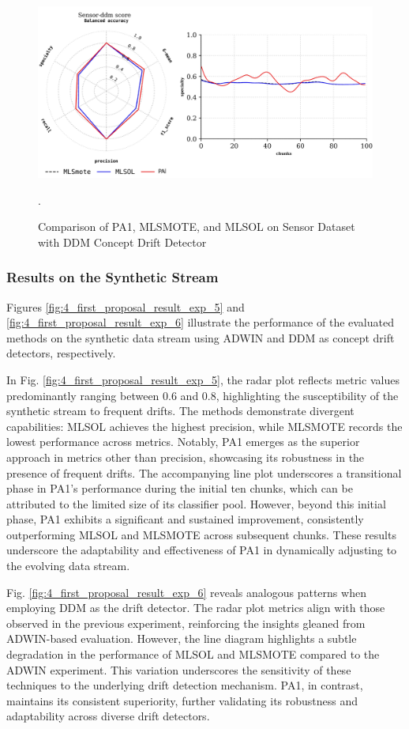 \begin{figure}[!ht]
	\centering
	\includegraphics[width=1\linewidth]{4_Imbalanced/figures/exp_4.png}
  \caption{Comparison of PA1, MLSMOTE, and MLSOL on Sensor Dataset with DDM Concept Drift Detector}.
	\label{fig:4_first_proposal_result_exp_4}
\end{figure}

\subsubsection{Results on the Synthetic Stream}

Figures \ref{fig:4_first_proposal_result_exp_5} and \ref{fig:4_first_proposal_result_exp_6} illustrate the performance of the evaluated methods on the synthetic data stream using ADWIN and DDM as concept drift detectors, respectively.

In Fig. \ref{fig:4_first_proposal_result_exp_5}, the radar plot reflects metric values predominantly ranging between 0.6 and 0.8, highlighting the susceptibility of the synthetic stream to frequent drifts. The methods demonstrate divergent capabilities: MLSOL achieves the highest precision, while MLSMOTE records the lowest performance across metrics. Notably, PA1 emerges as the superior approach in metrics other than precision, showcasing its robustness in the presence of frequent drifts. The accompanying line plot underscores a transitional phase in PA1’s performance during the initial ten chunks, which can be attributed to the limited size of its classifier pool. However, beyond this initial phase, PA1 exhibits a significant and sustained improvement, consistently outperforming MLSOL and MLSMOTE across subsequent chunks. These results underscore the adaptability and effectiveness of PA1 in dynamically adjusting to the evolving data stream.

Fig. \ref{fig:4_first_proposal_result_exp_6} reveals analogous patterns when employing DDM as the drift detector. The radar plot metrics align with those observed in the previous experiment, reinforcing the insights gleaned from ADWIN-based evaluation. However, the line diagram highlights a subtle degradation in the performance of MLSOL and MLSMOTE compared to the ADWIN experiment. This variation underscores the sensitivity of these techniques to the underlying drift detection mechanism. PA1, in contrast, maintains its consistent superiority, further validating its robustness and adaptability across diverse drift detectors.


